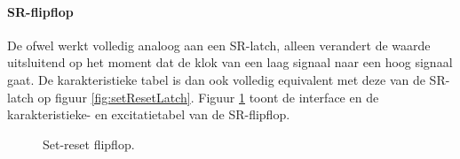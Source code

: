 \paragraph{SR-flipflop} De  ofwel  werkt volledig analoog aan een SR-latch, alleen verandert de waarde uitsluitend op het moment dat de klok van een laag signaal naar een hoog signaal gaat. De karakteristieke tabel is dan ook volledig equivalent met deze van de SR-latch op figuur \ref{fig:setResetLatch}. Figuur \ref{fig:setResetFlipflop} toont de interface en de karakteristieke- en excitatietabel van de SR-flipflop.
\begin{figure}[hbt]
\centering
{}
\caption{Set-reset flipflop.}
\label{fig:setResetFlipflop}
\end{figure}
